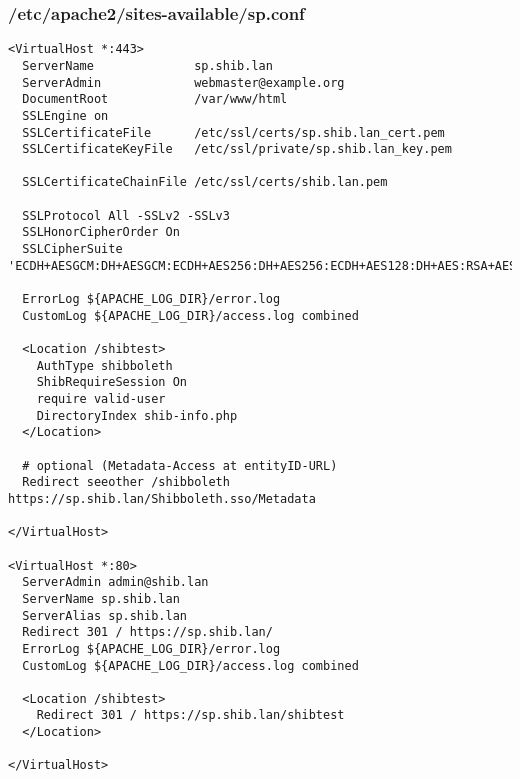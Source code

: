 \subsubsection{/etc/apache2/sites-available/sp.conf}
\begin{lstlisting}
<VirtualHost *:443>
  ServerName              sp.shib.lan
  ServerAdmin             webmaster@example.org
  DocumentRoot            /var/www/html
  SSLEngine on
  SSLCertificateFile      /etc/ssl/certs/sp.shib.lan_cert.pem
  SSLCertificateKeyFile   /etc/ssl/private/sp.shib.lan_key.pem

  SSLCertificateChainFile /etc/ssl/certs/shib.lan.pem

  SSLProtocol All -SSLv2 -SSLv3
  SSLHonorCipherOrder On
  SSLCipherSuite 'ECDH+AESGCM:DH+AESGCM:ECDH+AES256:DH+AES256:ECDH+AES128:DH+AES:RSA+AESGCM:RSA+AES:ECDH+3DES:DH+3DES:RSA+3DES:!aNULL:!eNULL:!LOW:!RC4:!MD5:!EXP:!PSK:!DSS:!SEED:!ECDSA:!CAMELLIA'

  ErrorLog ${APACHE_LOG_DIR}/error.log
  CustomLog ${APACHE_LOG_DIR}/access.log combined

  <Location /shibtest>
    AuthType shibboleth
    ShibRequireSession On
    require valid-user
    DirectoryIndex shib-info.php
  </Location>

  # optional (Metadata-Access at entityID-URL)
  Redirect seeother /shibboleth https://sp.shib.lan/Shibboleth.sso/Metadata

</VirtualHost>

<VirtualHost *:80>
  ServerAdmin admin@shib.lan
  ServerName sp.shib.lan
  ServerAlias sp.shib.lan
  Redirect 301 / https://sp.shib.lan/
  ErrorLog ${APACHE_LOG_DIR}/error.log
  CustomLog ${APACHE_LOG_DIR}/access.log combined

  <Location /shibtest>
    Redirect 301 / https://sp.shib.lan/shibtest
  </Location>

</VirtualHost>
\end{lstlisting}

